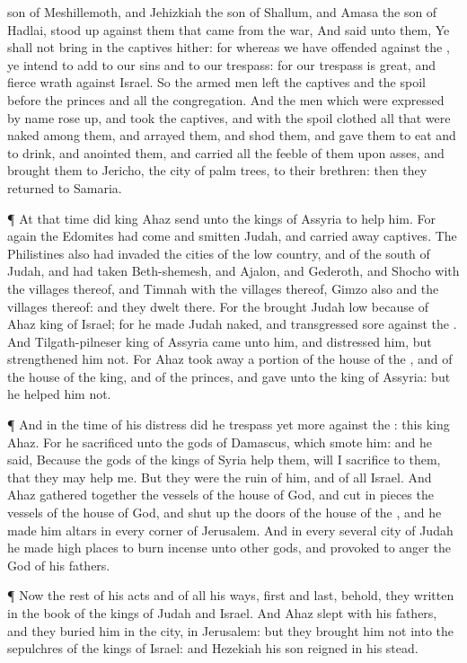 {son of
Meshillemoth, and
Jehizkiah the
son of
Shallum, and
Amasa the
son of
Hadlai, stood
up against them that
came from the
war,
And
said unto them, Ye shall not bring
in the
captives hither: for whereas we have
offended against the
{}
{}, ye
intend to
add
{} to our
sins and to our
trespass: for our
trespass is
great, and
{}
fierce
wrath against
Israel.
So the armed
men
left the
captives and the
spoil
before the
princes and all the
congregation.
And the
men which were
expressed by
name rose
up, and
took the
captives, and with the
spoil
clothed all that were
naked among them, and
arrayed them, and
shod them, and gave them to
eat and to
drink, and
anointed them, and
carried all the
feeble of them upon
asses, and
brought them to
Jericho, the
city of palm
trees,
to their
brethren: then they
returned to
Samaria.
\par }{\PP {}¶ At that
time did
king
Ahaz
send unto the
kings of
Assyria to
help him.
For again the
Edomites had
come and
smitten
Judah, and carried
away
captives.
The
Philistines also had
invaded the
cities of the low
country, and of the
south of
Judah, and had
taken
Beth-shemesh, and
Ajalon, and
Gederoth, and
Shocho with the
villages thereof, and
Timnah with the
villages thereof,
Gimzo also and the
villages thereof: and they
dwelt there.
For the
{}
brought
Judah
low because of
Ahaz
king of
Israel; for he
made
Judah
naked, and
transgressed
sore against the
{}.
And
Tilgath-pilneser
king of
Assyria
came unto him, and
distressed him, but
strengthened him not.
For
Ahaz took away a
portion
{} of the
house of the
{}, and
{} of the
house of the
king, and of the
princes, and
gave
{} unto the
king of
Assyria: but he
helped him not.
\par }{\PP {}¶ And in the
time of his
distress did he
trespass yet
more against the
{}: this
{}
king
Ahaz.
For he
sacrificed unto the
gods of
Damascus, which
smote him: and he
said, Because the
gods of the
kings of
Syria
help them,
{} will I
sacrifice to them, that they may
help me. But they were the
ruin of him, and of all
Israel.
And
Ahaz gathered
together the
vessels of the
house of
God, and cut in
pieces the
vessels of the
house of
God, and shut
up the
doors of the
house of the
{}, and he
made him
altars in every
corner of
Jerusalem.
And in every several
city of
Judah he
made high
places to burn
incense unto
other
gods, and provoked to
anger the
{}
God of his
fathers.
\par }{\PP {}¶ Now the
rest of his
acts and of all his
ways,
first and
last, behold, they
{}
written in the
book of the
kings of
Judah and
Israel.
And
Ahaz
slept with his
fathers, and they
buried him in the
city,
{} in
Jerusalem: but they
brought him not into the
sepulchres of the
kings of
Israel: and
Hezekiah his
son
reigned in his stead.

}
